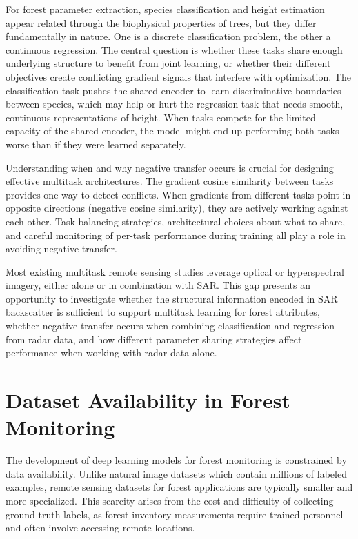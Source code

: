 For forest parameter extraction, species classification and height estimation appear related through the biophysical properties of trees, but they differ fundamentally in nature. One is a discrete classification problem, the other a continuous regression. The central question is whether these tasks share enough underlying structure to benefit from joint learning, or whether their different objectives create conflicting gradient signals that interfere with optimization. The classification task pushes the shared encoder to learn discriminative boundaries between species, which may help or hurt the regression task that needs smooth, continuous representations of height. When tasks compete for the limited capacity of the shared encoder, the model might end up performing both tasks worse than if they were learned separately.

Understanding when and why negative transfer occurs is crucial for designing effective multitask architectures. The gradient cosine similarity between tasks provides one way to detect conflicts. When gradients from different tasks point in opposite directions (negative cosine similarity), they are actively working against each other. Task balancing strategies, architectural choices about what to share, and careful monitoring of per-task performance during training all play a role in avoiding negative transfer.

Most existing multitask remote sensing studies leverage optical or hyperspectral imagery, either alone or in combination with SAR. This gap presents an opportunity to investigate whether the structural information encoded in SAR backscatter is sufficient to support multitask learning for forest attributes, whether negative transfer occurs when combining classification and regression from radar data, and how different parameter sharing strategies affect performance when working with radar data alone.

\section{Dataset Availability in Forest Monitoring}
\label{sec:datasets}

The development of deep learning models for forest monitoring is constrained by data availability. Unlike natural image datasets which contain millions of labeled examples, remote sensing datasets for forest applications are typically smaller and more specialized. This scarcity arises from the cost and difficulty of collecting ground-truth labels, as forest inventory measurements require trained personnel and often involve accessing remote locations.

